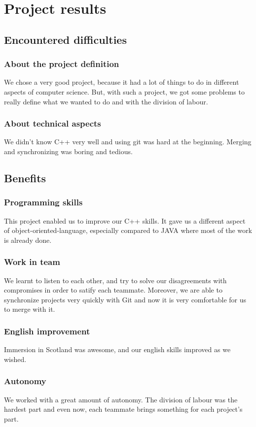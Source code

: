 \documentclass{scrreprt}
\begin{document}
					\part{Project results}
					\chapter{Encountered difficulties}
					\section{About the project definition}
					We chose a very good project, because it had a lot of things to do in different aspects of computer science. But, with such a project, we got some problems to really define what we wanted to do and with the division of labour.
					\section{About technical aspects}
					We didn't know C++ very well and using git was hard at the beginning. Merging and synchronizing was boring and tedious.
					\chapter{Benefits}
					\section{Programming skills}
					This project enabled us to improve our C++ skills. It gave us a different aspect of object-oriented-language, especially compared to JAVA where most of the work is already done.
					\section{Work in team}
					We learnt to listen to each other, and try to solve our disagreements with compromises in order to satify each teammate. Moreover, we are able to synchronize projects very quickly with Git and now it is very comfortable for us to merge with it.
					\section{English improvement}
					Immersion in Scotland was awesome, and our english skills improved as we wished.
					\section{Autonomy}
					We worked with a great amount of autonomy. The division of labour was the hardest part and even now, each teammate brings something for each project's part.
\end{document}
